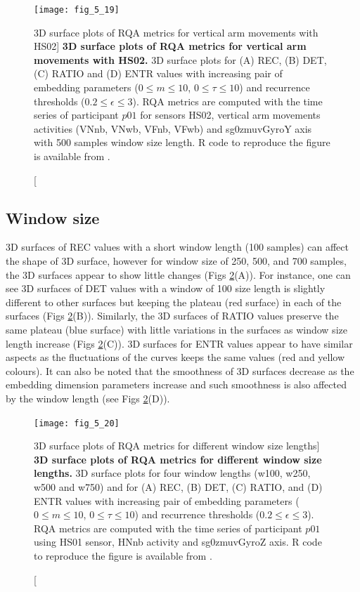 \begin{figure}
\centering
\texttt{[image: fig\_5\_19]}
    \caption
	[3D surface plots of RQA metrics for vertical arm movements with HS02]{
	{\bf 3D surface plots of RQA metrics for vertical arm movements with HS02.}
	3D surface plots for (A) REC, (B) DET, (C) RATIO and (D) ENTR values 
	with increasing pair of embedding parameters 
	($0 \le m \le 10$, $0 \le \tau \le 10$) 
	and recurrence thresholds ($ 0.2 \le \epsilon \le 3 $).
	RQA metrics are computed with the time series of participant $p01$ 
	for sensors HS02, vertical arm movements activities 
	(VNnb, VNwb, VFnb, VFwb) and 
	sg0zmuvGyroY axis with 500 samples window size length. 
        R code to reproduce the figure is available from \cite{xochicale2018}.
	}
\label{fig:topo_s_hs02_V_w500}
\end{figure}

\newpage
\subsection{Window size}
3D surfaces of REC values with a short window length (100 samples) can affect
the shape of 3D surface, however for window size of 250, 500, and 700 samples,
the 3D surfaces appear to show little changes 
(Figs \ref{fig:topo_windows_hii}(A)).
For instance, one can see 3D surfaces of DET values with a window of 100 
size length is slightly different to other surfaces but keeping the plateau
(red surface) in each of the surfaces (Figs \ref{fig:topo_windows_hii}(B)).
Similarly, the 3D surfaces of RATIO values preserve the same plateau 
(blue surface) with little variations in the surfaces as window size length 
increase (Figs \ref{fig:topo_windows_hii}(C)).
3D surfaces for ENTR values appear to have similar aspects as the 
fluctuations of the curves keeps the same values (red and yellow colours).
It can also be noted that the smoothness of 3D surfaces decrease as the 
embedding dimension parameters increase and such smoothness is also affected 
by the window length (see Figs \ref{fig:topo_windows_hii}(D)).

\begin{figure}
\centering
\texttt{[image: fig\_5\_20]}
    \caption
	[3D surface plots of RQA metrics for different window size lengths]{
	{\bf 3D surface plots of RQA metrics for different window size lengths.}
	3D surface plots for four window lengths (w100, w250, w500 and  w750)
	and for (A) REC, (B) DET, (C) RATIO, and (D) ENTR values
	with increasing pair of embedding parameters 
	($0 \le m \le 10$, $0 \le \tau \le 10$) 
	and recurrence thresholds ($ 0.2 \le \epsilon \le 3 $).
	RQA metrics are computed with the time series of participant $p01$ 
	using HS01 sensor, HNnb activity and sg0zmuvGyroZ axis.
	R code to reproduce the figure is available from \cite{xochicale2018}.
       }
\label{fig:topo_windows_hii}
\end{figure}

